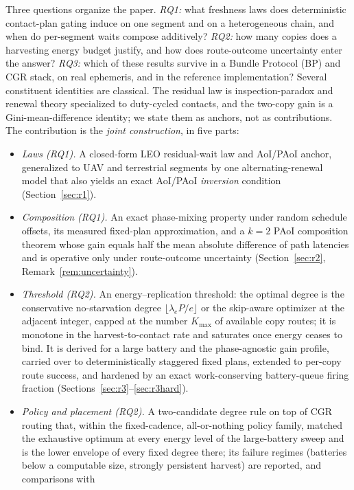 \documentclass[twocolumn,3p,times,procedia]{elsarticle}
\theoremstyle{plain}
\theoremstyle{remark}
\begin{document}
Three questions organize the paper. \emph{RQ1:} what freshness laws does
deterministic contact-plan gating induce on one segment and on a
heterogeneous chain, and when do per-segment waits compose additively?
\emph{RQ2:} how many copies does a harvesting energy budget justify, and
how does route-outcome uncertainty enter the answer? \emph{RQ3:} which
of these results survive in a Bundle Protocol (BP) and CGR stack, on
real ephemeris, and in the reference implementation? Several constituent
identities are classical. The residual law is inspection-paradox and
renewal theory specialized to duty-cycled contacts, and the two-copy
gain is a Gini-mean-difference identity; we state them as anchors, not
as contributions. The contribution is the \emph{joint construction}, in
five parts:
\begin{itemize}
\item \emph{Laws (RQ1).} A closed-form LEO residual-wait law and AoI/PAoI
anchor, generalized to UAV and terrestrial segments by one
alternating-renewal model that also yields an exact AoI/PAoI
\emph{inversion} condition (Section~\ref{sec:r1}).
\item \emph{Composition (RQ1).} An exact phase-mixing property under
random schedule offsets, its measured fixed-plan approximation, and a
$k{=}2$ PAoI composition theorem whose gain equals half the mean
absolute difference of path latencies and is operative only under
route-outcome uncertainty (Section~\ref{sec:r2},
Remark~\ref{rem:uncertainty}).
\item \emph{Threshold (RQ2).} An energy--replication threshold: the
optimal degree is the conservative no-starvation degree
$\lfloor\lambda_e P/e\rfloor$ or the skip-aware optimizer at the
adjacent integer, capped at the number $K_{\max}$ of available copy
routes; it is monotone in the harvest-to-contact rate and saturates once
energy ceases to bind. It is derived for a large battery and the
phase-agnostic gain profile, carried over to deterministically staggered
fixed plans, extended to per-copy route success, and hardened by an
exact work-conserving battery-queue firing fraction
(Sections~\ref{sec:r3}--\ref{sec:r3hard}).
\item \emph{Policy and placement (RQ2).} A two-candidate degree rule on
top of CGR routing that, within the fixed-cadence, all-or-nothing policy
family, matched the exhaustive optimum at every energy level of the
large-battery sweep and is the lower envelope of every fixed degree
there; its failure regimes (batteries below a computable size,
strongly persistent harvest) are reported, and comparisons with

\end{itemize}
\end{document}
